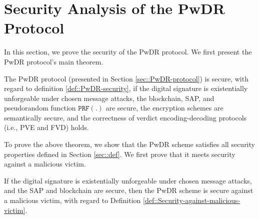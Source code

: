 
\section{Security Analysis of the PwDR Protocol}\label{sec::proof}

In this section, we prove the security of the PwDR protocol. We first present the PwDR protocol's main theorem. 


\begin{theorem}\label{theorem::PwDR-security}
The  PwDR protocol (presented in Section \ref{sec::PwDR-protocol}) is secure, with regard to definition \ref{def::PwDR-security}, if the digital signature is existentially unforgeable under chosen message attacks,  the blockchain, SAP, and pseudorandom function $\mathtt{PRF}(.)$ are secure,  the encryption schemes are semantically secure, and the correctness of verdict encoding-decoding protocols (i.e., PVE and FVD) holds. 
\end{theorem}






To prove the above  theorem, we show that the PwDR scheme satisfies all security properties defined in Section \ref{sec::def}. We first prove that it meets security against a malicious victim. 


\begin{lemma}\label{lemma::secure-against-a-malicious-victim} If the digital signature is existentially unforgeable under chosen message attacks, and the SAP and  blockchain are secure, then the PwDR scheme is secure against a malicious victim, with regard to Definition \ref{def::Security-against-malicious-victim}. 
\end{lemma}

